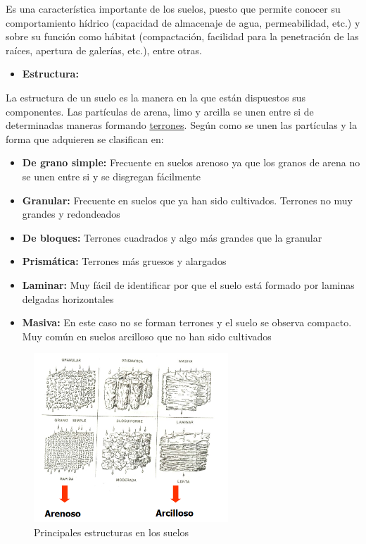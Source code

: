 \documentclass[a4paper,12pt,oneside]{article}
\begin{document}
 Es una característica importante de los suelos, puesto que permite conocer su
comportamiento hídrico (capacidad de almacenaje de agua, permeabilidad, etc.) y
sobre su función como hábitat (compactación, facilidad para la penetración de
las raíces, apertura de galerías, etc.), entre otras.
\begin{itemize}
\item \textbf{Estructura:}
\end{itemize}
La estructura de un suelo es la manera en la que están dispuestos sus
componentes. Las partículas de arena, limo y arcilla se unen entre si de
determinadas maneras formando \uline{terrones}. Según como se unen las partículas y la
forma que adquieren se clasifican en:
\begin{itemize}
\item \textbf{De grano simple:} Frecuente en suelos arenoso ya que los granos
de arena no se unen entre si y se disgregan fácilmente
\item \textbf{Granular:} Frecuente en suelos que ya han sido cultivados. Terrones no muy
grandes y redondeados
\item \textbf{De bloques:} Terrones cuadrados y algo más grandes que la granular
\item \textbf{Prismática:} Terrones más gruesos y alargados
\item \textbf{Laminar:} Muy fácil de identificar por que el suelo está formado por laminas
delgadas horizontales
\item \textbf{Masiva:} En este caso no se forman terrones y el suelo se observa
compacto. Muy común en suelos arcilloso que no han sido cultivados
\end{itemize}
\begin{center}
\begin{figure}[htbp]
\centering
\includegraphics[width=0.65\textwidth]{./img_uf1596/estructura.PNG}
\caption{Principales estructuras en los suelos}
\end{figure}
\end{center}
\end{document}
